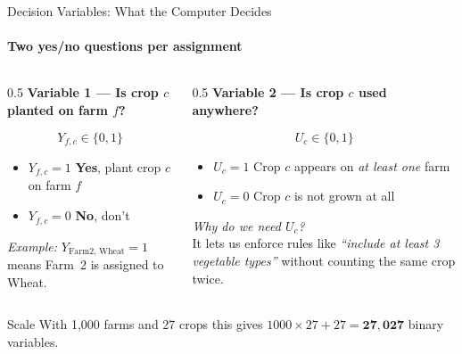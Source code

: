 \documentclass[aspectratio=169,10pt]{beamer}
\begin{document}
\begin{frame}{Decision Variables: What the Computer Decides}
    \framesubtitle{Two yes/no questions per assignment}

    \begin{columns}[T]
        \begin{column}{0.5\textwidth}
            \textbf{Variable 1 --- Is crop $c$ planted on farm $f$?}
            \vspace{0.2cm}

            \begin{equation*}
                Y_{f,c} \in \{0, 1\}
            \end{equation*}

            \vspace{0.1cm}
            \begin{itemize}\small
                \item $Y_{f,c} = 1$ \quad \textbf{Yes}, plant crop $c$ on farm $f$
                \item $Y_{f,c} = 0$ \quad \textbf{No}, don't
            \end{itemize}

            \vspace{0.5cm}
            \textit{Example:} $Y_{\text{Farm2, Wheat}} = 1$ means
            Farm~2 is assigned to Wheat.
        \end{column}
        \begin{column}{0.5\textwidth}
            \textbf{Variable 2 --- Is crop $c$ used anywhere?}
            \vspace{0.2cm}

            \begin{equation*}
                U_{c} \in \{0, 1\}
            \end{equation*}

            \vspace{0.1cm}
            \begin{itemize}\small
                \item $U_c = 1$ \quad Crop $c$ appears on \textit{at least one} farm
                \item $U_c = 0$ \quad Crop $c$ is not grown at all
            \end{itemize}

            \vspace{0.5cm}
            \textit{Why do we need $U_c$?}\\
            It lets us enforce rules like
            \emph{``include at least 3 vegetable types''} without
            counting the same crop twice.
        \end{column}
    \end{columns}

    \vspace{0.4cm}
    \begin{alertblock}{Scale}
        With 1,000 farms and 27 crops this gives
        $1000 \times 27 + 27 = \mathbf{27{,}027}$ binary variables.
    \end{alertblock}
\end{frame}
\end{document}
